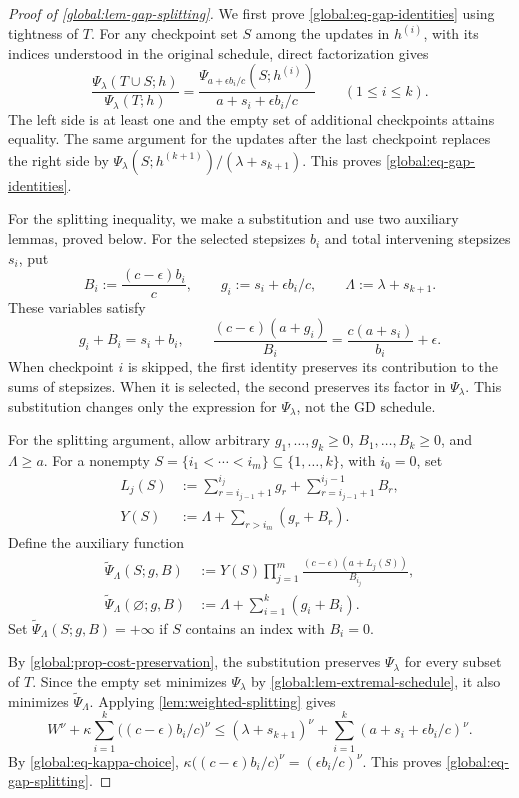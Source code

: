 \documentclass[11pt,letterpaper]{article}
\theoremstyle{definition}
\begin{document}
\begin{proof}[Proof of \cref{global:lem-gap-splitting}]
We first prove \eqref{global:eq-gap-identities} using tightness of $T$.
For any checkpoint set $S$ among the updates in $h^{(i)}$, with its indices understood in the original schedule, direct factorization gives
\[
  \frac{\Psi_\lambda(T\cup S;h)}{\Psi_\lambda(T;h)}
  =\frac{\Psi_{a+\epsilon b_i/c}(S;h^{(i)})}{a+s_i+\epsilon b_i/c}
  \qquad(1\le i\le k).
\]
The left side is at least one and the empty set of additional checkpoints attains equality.
The same argument for the updates after the last checkpoint replaces the right side by $\Psi_\lambda(S;h^{(k+1)})/(\lambda+s_{k+1})$.
This proves \eqref{global:eq-gap-identities}.

For the splitting inequality, we make a substitution and use two auxiliary lemmas, proved below.
For the selected stepsizes $b_i$ and total intervening stepsizes $s_i$, put
\begin{equation}
  B_i:=\frac{(c-\epsilon)b_i}{c},\qquad g_i:=s_i+\epsilon b_i/c,\qquad
  \Lambda:=\lambda+s_{k+1}.
  \label{global:eq-cost-move}
\end{equation}
These variables satisfy
\[
  g_i+B_i=s_i+b_i,
  \qquad
  \frac{(c-\epsilon)(a+g_i)}{B_i}=\frac{c(a+s_i)}{b_i}+\epsilon.
\]
When checkpoint $i$ is skipped, the first identity preserves its contribution to the sums of stepsizes.
When it is selected, the second preserves its factor in $\Psi_\lambda$.
This substitution changes only the expression for $\Psi_\lambda$, not the GD schedule.

For the splitting argument, allow arbitrary $g_1,\ldots,g_k\ge0$, $B_1,\ldots,B_k\ge0$, and $\Lambda\ge a$.
For a nonempty $S=\{i_1<\cdots<i_m\}\subseteq\{1,\ldots,k\}$, with $i_0=0$, set
\[
\begin{aligned}
  L_j(S)&:=\sum_{r=i_{j-1}+1}^{i_j}g_r
          +\sum_{r=i_{j-1}+1}^{i_j-1}B_r,\\
  Y(S)&:=\Lambda+\sum_{r>i_m}(g_r+B_r).
\end{aligned}
\]
Define the auxiliary function
\begin{align}
  \widetilde\Psi_\Lambda(S;g,B)
    &:=Y(S)\prod_{j=1}^m\frac{(c-\epsilon)(a+L_j(S))}{B_{i_j}},
    \label{global:eq-pure-cost}\\
  \widetilde\Psi_\Lambda(\varnothing;g,B)
    &:=\Lambda+\sum_{i=1}^k(g_i+B_i).
    \label{global:eq-pure-empty}
\end{align}
Set $\widetilde\Psi_\Lambda(S;g,B)=+\infty$ if $S$ contains an index with $B_i=0$.

By \cref{global:prop-cost-preservation}, the substitution preserves $\Psi_\lambda$ for every subset of $T$.
Since the empty set minimizes $\Psi_\lambda$ by \cref{global:lem-extremal-schedule}, it also minimizes $\widetilde\Psi_\Lambda$.
Applying \cref{lem:weighted-splitting} gives
\begin{equation*}
  W^\nu+\kappa\sum_{i=1}^k\bigl((c-\epsilon)b_i/c\bigr)^\nu
  \le(\lambda+s_{k+1})^\nu+
      \sum_{i=1}^k(a+s_i+\epsilon b_i/c)^\nu.
\end{equation*}
By \eqref{global:eq-kappa-choice}, $\kappa\bigl((c-\epsilon)b_i/c\bigr)^\nu=(\epsilon b_i/c)^\nu$.
This proves \eqref{global:eq-gap-splitting}.
\end{proof}
\end{document}
